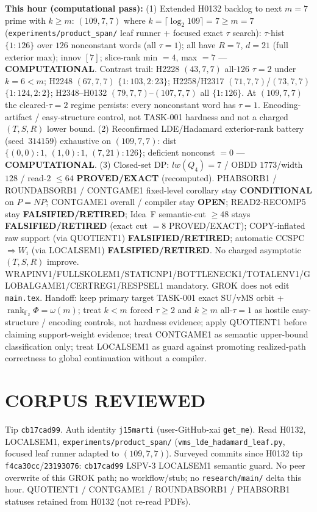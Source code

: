 \documentclass[11pt]{article}
\begin{document}
\textbf{This hour (computational pass):}
(1) Extended H0132 backlog to next $m{=}7$ prime with $k{\ge}m$:
$(109,7,7)$ where $k=\lceil\log_2 109\rceil=7{\ge}m{=}7$
(\texttt{experiments/product\_span/} leaf runner + focused exact $\tau$ search):
$\tau$-hist $\{1{:}126\}$ over $126$ nonconstant words (all $\tau{=}1$);
all have $R{=}7$, $d{=}21$ (full exterior max); innov $[7]$;
slice-rank min $=4$, max $=7$ --- \textbf{COMPUTATIONAL}.
Contrast trail: H2228 $(43,7,7)$ all-$126$ $\tau{=}2$ under $k{=}6{<}m$;
H2248 $(67,7,7)$ $\{1{:}103,2{:}23\}$; H2258/H2317 $(71,7,7)$/$(73,7,7)$ $\{1{:}124,2{:}2\}$;
H2348--H0132 $(79,7,7)$--$(107,7,7)$ all $\{1{:}126\}$.
At $(109,7,7)$ the cleared-$\tau{=}2$ regime persists:
every nonconstant word has $\tau{=}1$. Encoding-artifact / easy-structure control,
not TASK-001 hardness and not a charged $(T,S,R)$ lower bound.
(2) Reconfirmed LDE/Hadamard exterior-rank battery (seed~$314159$) exhaustive on
$(109,7,7)$: dist $\{(0,0){:}1,\,(1,0){:}1,\,(7,21){:}126\}$; deficient nonconst $=0$ ---
\textbf{COMPUTATIONAL}.
(3) Closed-set DP: $lw(Q_4)=7$ / OBDD $1773$/width $128$ / read-$2$ $\le64$
\textbf{PROVED/EXACT} (recomputed).
PHABSORB1 / ROUNDABSORB1 / CONTGAME1 fixed-level corollary stay \textbf{CONDITIONAL} on $P=NP$;
CONTGAME1 overall / compiler stay \textbf{OPEN}; READ2-RECOMP5 stay \textbf{FALSIFIED/RETIRED};
Idea~F semantic-cut $\ge48$ stays \textbf{FALSIFIED/RETIRED} (exact cut $=8$ PROVED/EXACT);
COPY-inflated raw support (via QUOTIENT1) \textbf{FALSIFIED/RETIRED};
automatic CCSPC$\Rightarrow W_i$ (via LOCALSEM1) \textbf{FALSIFIED/RETIRED}.
No charged asymptotic $(T,S,R)$ improve.
WRAPINV1/FULLSKOLEM1/STATICNP1/BOTTLENECK1/TOTALENV1/GLOBALGAME1/CERTREG1/RESPSEL1 mandatory.
GROK does not edit \texttt{main.tex}.
Handoff: keep primary target TASK-001 exact SU/vMS orbit + $\operatorname{rank}_{\mathbb F_2}\Phi=\omega(m)$;
treat $k{<}m$ forced $\tau{\ge}2$ and $k{\ge}m$ all-$\tau{=}1$ as hostile easy-structure /
encoding controls, not hardness evidence; apply QUOTIENT1 before claiming support-weight
evidence; treat CONTGAME1 as semantic upper-bound classification only; treat LOCALSEM1 as
guard against promoting realized-path correctness to global continuation without a compiler.

\section*{CORPUS REVIEWED}
Tip \texttt{cb17cad99}. Auth identity \texttt{j15marti} (user-GitHub-xai \texttt{get\_me}).
Read H0132, LOCALSEM1, \texttt{experiments/product\_span/}
(\texttt{vms\_lde\_hadamard\_leaf.py}, focused leaf runner adapted to $(109,7,7)$).
Surveyed commits since H0132 tip \texttt{f4ca30cc}/\texttt{23193076}:
\texttt{cb17cad99} LSPV-3 LOCALSEM1 semantic guard.
No peer overwrite of this GROK path; no workflow/stub; no \texttt{research/main/} delta this hour.
QUOTIENT1 / CONTGAME1 / ROUNDABSORB1 / PHABSORB1 statuses retained from H0132 (not re-read PDFs).
\end{document}
